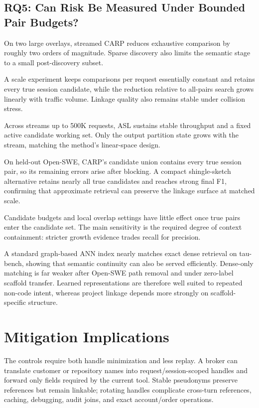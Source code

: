 \documentclass[letterpaper]{article} %
\newcommand{\carp}{\textsc{CARP}\xspace}
\newcommand{\asl}{\textsc{ASL}\xspace}
\begin{document}
\subsection{RQ5: Can Risk Be Measured Under Bounded Pair Budgets?}

On two large overlays, streamed \carp reduces exhaustive comparison by roughly two orders of
magnitude. Sparse discovery also limits the semantic stage to a small post-discovery subset.

A scale experiment keeps comparisons per request essentially constant and retains every
true session candidate, while the reduction relative to all-pairs search grows linearly with traffic
volume. Linkage quality also remains stable under collision stress.

Across streams up to 500K requests, \asl sustains stable throughput and a fixed active candidate
working set.
Only the output partition state grows with the stream, matching the method's linear-space design.

On held-out Open-SWE, \carp's candidate union contains every true session pair, so its remaining
errors arise after blocking. A compact shingle-sketch alternative retains nearly all true candidates
and reaches strong final F1, confirming that approximate retrieval can preserve the linkage surface
at matched scale.

Candidate budgets and local overlap settings have little effect once true pairs enter the candidate
set. The main sensitivity is the required degree of context containment: stricter growth evidence
trades recall for precision.

A standard graph-based ANN index \cite{malkov2020hnsw} nearly matches exact dense retrieval on
tau-bench, showing that semantic continuity can also be served efficiently. Dense-only matching is
far weaker after Open-SWE path removal and under zero-label scaffold transfer. Learned
representations are therefore well suited to repeated non-code intent, whereas project linkage
depends more strongly on scaffold-specific structure.

\section{Mitigation Implications}

The controls require both handle minimization and less replay. A broker can translate customer or
repository names into request/session-scoped handles and forward only fields required by the current
tool. Stable pseudonyms preserve references but remain linkable; rotating handles complicate
cross-turn references, caching, debugging, audit joins, and exact account/order operations.
\end{document}
